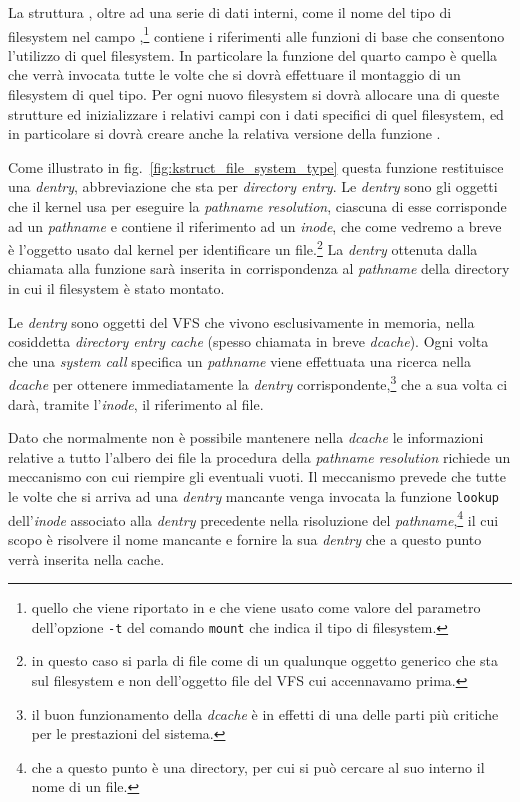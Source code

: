 La struttura , oltre ad una serie di dati interni,
come il nome del tipo di filesystem nel campo ,\footnote{quello che
  viene riportato in  e che viene usato come
  valore del parametro dell'opzione \texttt{-t} del comando \texttt{mount} che
  indica il tipo di filesystem.}  contiene i riferimenti alle funzioni di base
che consentono l'utilizzo di quel filesystem. In particolare la funzione
 del quarto campo è quella che verrà invocata tutte le volte che
si dovrà effettuare il montaggio di un filesystem di quel tipo. Per ogni nuovo
filesystem si dovrà allocare una di queste strutture ed inizializzare i
relativi campi con i dati specifici di quel filesystem, ed in particolare si
dovrà creare anche la relativa versione della funzione .


Come illustrato in fig.~\ref{fig:kstruct_file_system_type} questa funzione
restituisce una \textit{dentry}, abbreviazione che sta per \textit{directory
  entry}. Le \textit{dentry} sono gli oggetti che il kernel usa per eseguire
la \textit{pathname resolution}, ciascuna di esse corrisponde ad un
\textit{pathname} e contiene il riferimento ad un \textit{inode}, che come
vedremo a breve è l'oggetto usato dal kernel per identificare un
file.\footnote{in questo caso si parla di file come di un qualunque oggetto
  generico che sta sul filesystem e non dell'oggetto file del VFS cui
  accennavamo prima.} La \textit{dentry} ottenuta dalla chiamata alla funzione
 sarà inserita in corrispondenza al \textit{pathname} della
directory in cui il filesystem è stato montato.


Le \textit{dentry} sono oggetti del VFS che vivono esclusivamente in memoria,
nella cosiddetta \textit{directory entry cache} (spesso chiamata in breve
\textit{dcache}). Ogni volta che una \textit{system call} specifica un
\textit{pathname} viene effettuata una ricerca nella \textit{dcache} per
ottenere immediatamente la \textit{dentry} corrispondente,\footnote{il buon
  funzionamento della \textit{dcache} è in effetti di una delle parti più
  critiche per le prestazioni del sistema.} che a sua volta ci darà, tramite
l'\textit{inode}, il riferimento al file.

Dato che normalmente non è possibile mantenere nella \textit{dcache} le
informazioni relative a tutto l'albero dei file la procedura della
\textit{pathname resolution} richiede un meccanismo con cui riempire gli
eventuali vuoti. Il meccanismo prevede che tutte le volte che si arriva ad una
\textit{dentry} mancante venga invocata la funzione \texttt{lookup}
dell'\textit{inode} associato alla \textit{dentry} precedente nella
risoluzione del \textit{pathname},\footnote{che a questo punto è una
  directory, per cui si può cercare al suo interno il nome di un file.} il cui
scopo è risolvere il nome mancante e fornire la sua \textit{dentry} che a
questo punto verrà inserita nella cache.

